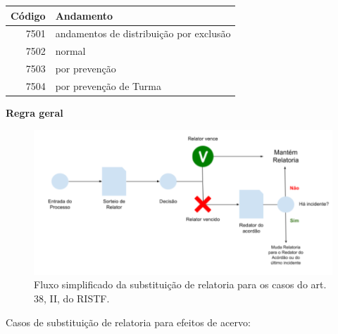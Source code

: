 \documentclass[
]{book}
\theoremstyle{definition}
\theoremstyle{definition}
\theoremstyle{definition}
\theoremstyle{definition}
\theoremstyle{remark}
\begin{document}
\begin{tabular}{r|l}
\hline
Código & Andamento\\
\hline
7501 & andamentos de distribuição por exclusão\\
\hline
7502 & normal\\
\hline
7503 & por prevenção\\
\hline
7504 & por prevenção de Turma\\
\hline
\end{tabular}

\textbf{Regra geral}

\begin{figure}
\includegraphics[width=1\linewidth]{imagens/fig-cap4-3} \caption{Fluxo simplificado da substituição de relatoria para os casos do  art. 38, II, do RISTF.}\label{fig:unnamed-chunk-13}
\end{figure}

Casos de substituição de relatoria para efeitos de acervo:
\end{document}
